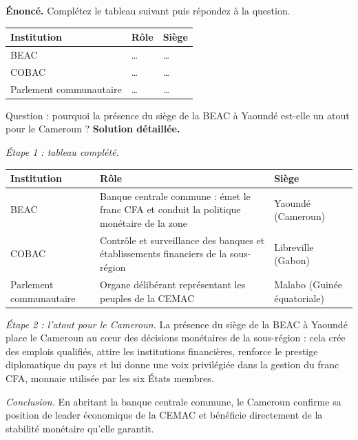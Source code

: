 \documentclass[11pt]{article}
\begin{document}
\begin{exoresolu}
\textbf{Énoncé.} Complétez le tableau suivant puis répondez à la question.

\begin{center}
\begin{tabularx}{\linewidth}{|l|X|X|}
\hline
\rowcolor{popblueL} \textbf{Institution} & \textbf{Rôle} & \textbf{Siège} \\
\hline
BEAC & \ldots & \ldots \\
\hline
COBAC & \ldots & \ldots \\
\hline
Parlement communautaire & \ldots & \ldots \\
\hline
\end{tabularx}
\end{center}

Question : pourquoi la présence du siège de la BEAC à Yaoundé est-elle un atout pour le Cameroun ?
\tcblower
\textbf{Solution détaillée.}

\emph{Étape 1 : tableau complété.}

\begin{center}
\begin{tabularx}{\linewidth}{|l|X|X|}
\hline
\rowcolor{popblueL} \textbf{Institution} & \textbf{Rôle} & \textbf{Siège} \\
\hline
BEAC & Banque centrale commune : émet le franc CFA et conduit la politique monétaire de la zone & Yaoundé (Cameroun) \\
\hline
COBAC & Contrôle et surveillance des banques et établissements financiers de la sous-région & Libreville (Gabon) \\
\hline
Parlement communautaire & Organe délibérant représentant les peuples de la CEMAC & Malabo (Guinée équatoriale) \\
\hline
\end{tabularx}
\end{center}

\emph{Étape 2 : l'atout pour le Cameroun.} La présence du siège de la BEAC à Yaoundé place le Cameroun au cœur des décisions monétaires de la sous-région : cela crée des emplois qualifiés, attire les institutions financières, renforce le prestige diplomatique du pays et lui donne une voix privilégiée dans la gestion du franc CFA, monnaie utilisée par les six États membres.

\emph{Conclusion.} En abritant la banque centrale commune, le Cameroun confirme sa position de leader économique de la CEMAC et bénéficie directement de la stabilité monétaire qu'elle garantit.
\end{exoresolu}
\end{document}
